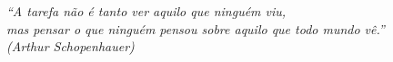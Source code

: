 \begin{epigrafe}
    \vspace*{\fill}
	\begin{flushright}
		\textit{``A tarefa não é tanto ver aquilo que ninguém viu, \\
		          mas pensar o que ninguém pensou sobre aquilo que todo mundo vê.''\\
		          (Arthur Schopenhauer)}
	\end{flushright}
\end{epigrafe}
